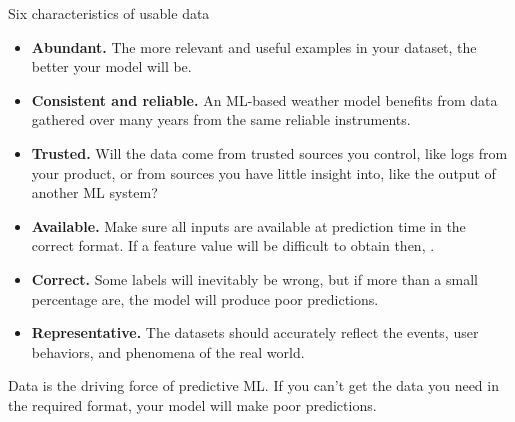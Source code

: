 \begin{frame}{Six characteristics of usable data}
  \begin{withmargin}
    \begin{tdmain}
      \footnotesize
      \begin{itemize}
        \item \textbf{Abundant.} The more relevant and useful examples in your
          dataset, the better your model will be.
        \item \textbf{Consistent and reliable.} An ML-based weather model
          benefits from data gathered over many years from the same reliable
          instruments.
        \item \textbf{Trusted.} Will the data come from trusted sources you
          control, like logs from your product, or from sources you have little
          insight into, like the output of another ML system?
        \item \textbf{Available.} Make sure all inputs are available at
          prediction time in the correct format. If a feature value will be
          difficult to obtain then, .
        \item \textbf{Correct.} Some labels will inevitably be wrong, but if
          more than a small percentage are, the model will produce poor
          predictions.
        \item \textbf{Representative.} The datasets should accurately reflect
          the events, user behaviors, and phenomena of the real world.
      \end{itemize}
    \end{tdmain}
    \begin{tdmargin}
      \vfill
      Data is the driving force of predictive ML. If you can't get the data you
      need in the required format, your model will make poor predictions.
      \vfill
    \end{tdmargin}
  \end{withmargin}
\end{frame}

